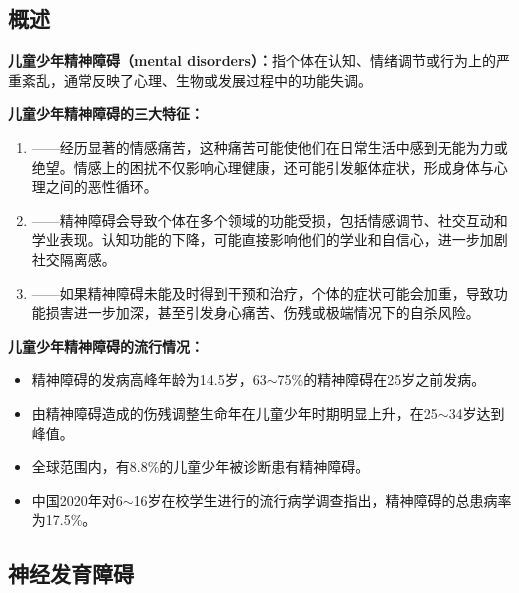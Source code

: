 \subsection{概述}

\begin{defbox}
\textbf{儿童少年精神障碍（mental disorders）：}指个体在认知、情绪调节或行为上的严重紊乱，通常反映了心理、生物或发展过程中的功能失调。
\end{defbox}

\begin{keybox}
\textbf{儿童少年精神障碍的三大特征：}

\begin{enumerate}[leftmargin=*]
    \item {}——经历显著的情感痛苦，这种痛苦可能使他们在日常生活中感到无能为力或绝望。情感上的困扰不仅影响心理健康，还可能引发躯体症状，形成身体与心理之间的恶性循环。

    \item {}——精神障碍会导致个体在多个领域的功能受损，包括情感调节、社交互动和学业表现。认知功能的下降，可能直接影响他们的学业和自信心，进一步加剧社交隔离感。

    \item {}——如果精神障碍未能及时得到干预和治疗，个体的症状可能会加重，导致功能损害进一步加深，甚至引发身心痛苦、伤残或极端情况下的自杀风险。
\end{enumerate}
\end{keybox}

\begin{exambox}
\textbf{儿童少年精神障碍的流行情况：}

\begin{itemize}[leftmargin=*]
    \item 精神障碍的发病高峰年龄为14.5岁，63$\sim$75\%的精神障碍在25岁之前发病。
    \item 由精神障碍造成的伤残调整生命年在儿童少年时期明显上升，在25$\sim$34岁达到峰值。
    \item 全球范围内，有8.8\%的儿童少年被诊断患有精神障碍。
    \item 中国2020年对6$\sim$16岁在校学生进行的流行病学调查指出，精神障碍的总患病率为17.5\%。
\end{itemize}
\end{exambox}

\subsection{神经发育障碍}

